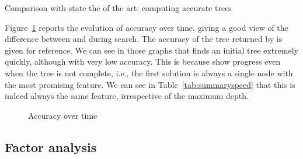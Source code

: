 \documentclass{llncs}
\begin{document}



\begin{table}[htbp]
\begin{center}
\begin{footnotesize}
\tabcolsep=1.8pt

\end{footnotesize}
\end{center}
\caption{\label{tab:summaryspeed} Comparison with state the of the art: computing accurate trees}
\end{table}


Figure~\ref{fig:cactus} reports the evolution of accuracy over time, giving a good view of the difference between \murtree and \budalg during search. The accuracy of the tree returned by \cart is given for reference. 
We can see in those graphs that \murtree finds an initial tree extremely quickly, although with very low accuracy. This is because \murtree show progress even when the tree is not complete, i.e., the first solution is always a single node with the most promising feature. We can see in Table~\ref{tab:summaryspeed} that this is indeed always the same feature, irrespective of the maximum depth.




\begin{figure}
	\subfloat[depth=3]{}
	\subfloat[depth=5]{}
	\subfloat[depth=7]{}

	\subfloat[depth=8]{}
	\subfloat[depth=9]{}
	\subfloat[depth=10]{}
	\caption{\label{fig:cactus}Accuracy over time}
\end{figure}

\subsection{Factor analysis}
\end{document}
